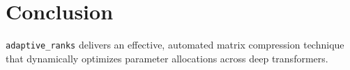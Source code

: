\section{Conclusion}\texttt{adaptive\_ranks} delivers an effective, automated matrix compression technique that dynamically optimizes parameter allocations across deep transformers.
